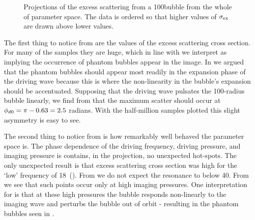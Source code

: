  \begin{figure}
  \begin{minipage}{\textwidth}
   \begin{center}
      \begin{narrow}{0cm}{-1cm}
        \subfloat[]{
     \label{fig:projection:dr_fr}
     } 
  \subfloat[]{
    \label{fig:projection:im_fr}
    }
  \end{narrow}
  \begin{narrow}{-1cm}{-1cm}
\subfloat[]{
     \label{fig:projection:dr_amp}
     }
\subfloat[]{
     \label{fig:projection:im_amp}
     }
 \end{narrow}
 \caption{Projections of the excess scattering from a \unit{100}\nano\metre bubble from the whole of parameter space.
      The data is ordered so that higher values of $\sigma_\textrm{ex}$ are drawn above lower values.
   }
     \label{fig:projections}
 \end{center}
  \end{minipage}
 \end{figure}
The first thing to notice from   are the values of the excess scattering cross section.
For many of the samples they are huge,
which in line with  we interpret as implying the occurrence of phantom bubbles appear in the image.
In  we argued that the phantom bubbles should appear most readily 
in the expansion phase of the driving wave because this is where the non-linearity in the bubble's expansion should be accentuated.
Supposing that the driving wave pulsates the \unit{100}\nano\metre-radius bubble linearly,
we find from  that the maximum scatter should occur at ${\phi_{d0}} = \pi - 0.63 = 2.5$ radians.
With the half-million samples plotted this slight  asymmetry is easy to see.



The second thing to notice from   is  how remarkably well behaved the parameter space is.
The phase dependence of the driving frequency, driving pressure, and imaging pressure is contains, in the projection, 
no unexpected hot-spots.
The only unexpected result is that excess scattering cross section was high for the `low' frequency of \unit{18}\mega\hertz\ ().
From  we do not expect the resonance to below \unit{40}\mega\hertz.
From   we see that such points occur only at high imaging pressures.
One interpretation for  is that at these high pressures the bubble responds non-linearly to the imaging wave
and perturbs the bubble out of orbit - resulting in the phantom bubbles seen in .



